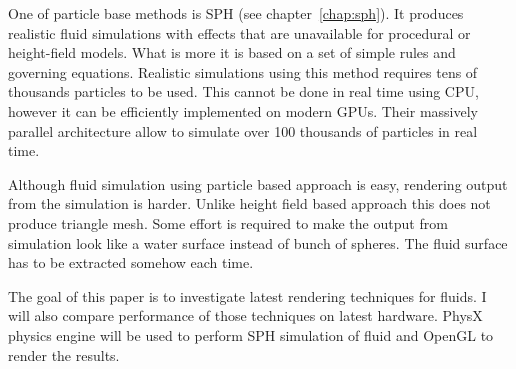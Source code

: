 
One of particle base methods is SPH (see chapter~\ref{chap:sph}). It produces realistic fluid simulations with effects that are unavailable for procedural or height-field models. What is more it is based on a set of simple rules and governing equations. Realistic simulations using this method requires tens of thousands particles to be used. This cannot be done in real time using CPU, however it can be efficiently implemented on modern GPUs. Their massively parallel architecture allow to simulate over 100 thousands of particles in real time. 

Although fluid simulation using particle based approach is easy, rendering output from the simulation is harder. Unlike height field based approach this does not produce triangle mesh. Some effort is required to make the output from simulation look like a water surface instead of bunch of spheres. The fluid surface has to be extracted somehow each time. 

The goal of this paper is to investigate latest rendering techniques for fluids. I will also compare performance of those techniques on latest hardware. PhysX physics engine will be used to perform SPH simulation of fluid and OpenGL to render the results. 





